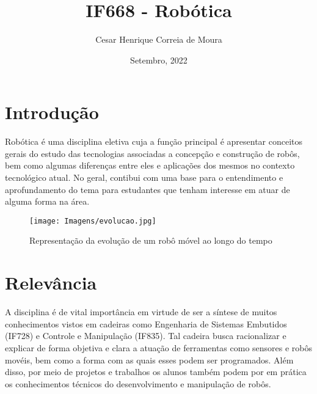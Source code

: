 \documentclass[a4paper, 12pt]{article}
\title{IF668 - Robótica}
\author{Cesar Henrique Correia de Moura}
\date{Setembro, 2022}
\begin{document}
\maketitle


\section{Introdução}
\par
Robótica é uma disciplina eletiva cuja a função principal é apresentar conceitos gerais do estudo das tecnologias associadas a concepção e construção de robôs, bem como algumas diferenças entre eles e aplicações dos mesmos no contexto tecnológico atual.  No geral, contibui com uma base para o entendimento e aprofundamento do tema para estudantes que tenham interesse em atuar de alguma forma na área.\cite{sitecinIC}
\par
\begin{figure}[h]
    \centering
    \texttt{[image: Imagens/evolucao.jpg]}
    \caption{Representação da evolução de um robô móvel ao longo do tempo\cite{artigo_computadores}}
    \label{fig:evolucao}
\end{figure}
    
    
\section{Relevância}
    \par
A disciplina é de vital importância em virtude de ser a síntese de muitos conhecimentos vistos em cadeiras como Engenharia de Sistemas Embutidos (IF728) e Controle e Manipulação (IF835). Tal cadeira busca racionalizar e explicar de forma objetiva e clara a atuação de ferramentas como sensores e robôs movéis, bem como a forma com as quais esses podem ser programados. Além disso, por meio de projetos e trabalhos os alunos também podem por em prática os conhecimentos técnicos do desenvolvimento e manipulação de robôs.\cite{sitecinPERFIL}
\end{document}

